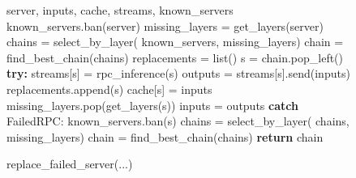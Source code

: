 \begin{figure*}[tb]
\begin{minipage}{0.42\textwidth}
\begin{algorithm}[H]
\begin{algorithmic}[1]
\end{algorithmic}
\end{algorithm}
\vspace{-18px}
\begin{algorithm}[H]
  \caption{{\color{blue}replace\_failed\_server}(...)}
  \label{alg:replace}
\begin{algorithmic}[1]
  \REQUIRE server, inputs, cache, streams, known\_servers
  \STATE known\_servers.ban(server)
  \STATE missing\_layers = get\_layers(server)
  \STATE chains = select\_by\_layer(
  \STATE \hspace{8px} known\_servers, missing\_layers)
  \STATE chain = find\_best\_chain(chains)
  \STATE replacements = list()
    \STATE \hspace{-4px} s = chain.pop\_left()
    \STATE \hspace{-4px} \textbf{try:}
    \STATE \hspace{4px} streams[s] {=} {\color{blue}rpc\_inference}(s)
    \STATE \hspace{4px} outputs = streams[s].send(inputs)
    \STATE \hspace{4px} replacements.append(s)
    \STATE \hspace{4px} cache[s] = inputs
    \STATE \hspace{4px} missing\_layers.pop(get\_layers(s))
    \STATE \hspace{4px} inputs = outputs
    \STATE \hspace{-4px} \textbf{catch} FailedRPC:
    \STATE \hspace{4px} known\_servers.ban(s)
    \STATE \hspace{4px} chains = select\_by\_layer(
    \STATE \hspace{12px} chains, missing\_layers)
    \STATE \hspace{4px} chain = find\_best\_chain(chains)
  \ENDWHILE
  \STATE \textbf{return} chain
\end{algorithmic}
\end{algorithm}
\vspace{-18px}\end{minipage}
\vspace{-5pt}
\end{figure*}

